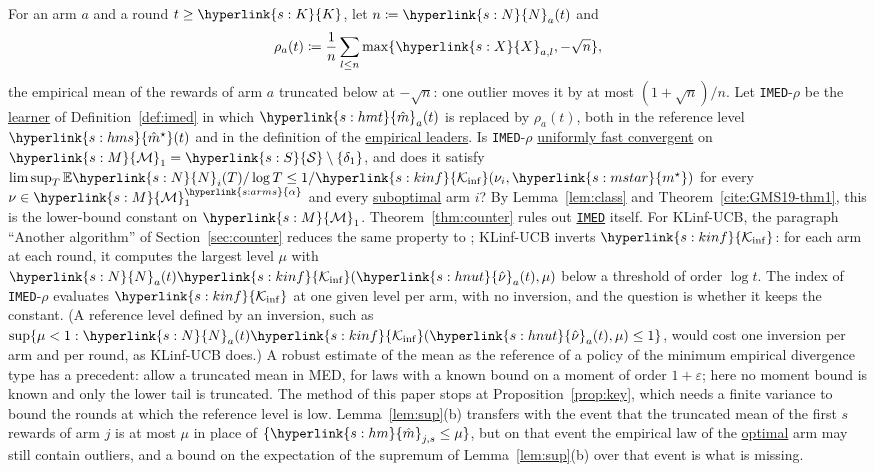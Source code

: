 \documentclass[11pt]{article}
\newcommand{\E}{\mathbb{E}}
\newcommand{\sy}[2]{{\hyperlink{#1}{#2}}}
\newcommand{\term}[2]{\hyperlink{#1}{#2}}
\newcommand{\imed}{\hyperref[alg:imed]{\texttt{IMED}}}
\newcommand{\Sm}{\sy{s:S}{\mathcal{S}}}
\newcommand{\Mm}{\sy{s:M}{\mathcal{M}}}
\newcommand{\arms}{\sy{s:arms}{\alpha}}
\newcommand{\Karms}{\sy{s:K}{K}}
\newcommand{\ms}{\sy{s:mstar}{m^{\star}}}
\newcommand{\Kinf}{\sy{s:kinf}{\mathcal{K}_{\inf}}}
\newcommand{\Xs}{\sy{s:X}{X}}
\newcommand{\Np}{\sy{s:N}{N}}
\newcommand{\hm}{\sy{s:hm}{\hat{m}}}
\newcommand{\hnut}{\sy{s:hnut}{\hat{\nu}}}
\newcommand{\hmt}{\sy{s:hmt}{\hat{m}}}
\newcommand{\hms}{\sy{s:hms}{\hat{m}^{\star}}}
\begin{document}
\begin{openquestion}\label{oq:finite-mean}
For an arm $a$ and a round $t\ge\Karms$, let $n\coloneqq\Np_a(t)$ and
\begin{equation*}
  \rho_a(t)\coloneqq\frac1n\sum_{l\le n}\max\{\Xs_{a,l},-\sqrt n\},
\end{equation*}
the empirical mean of the rewards of arm $a$ truncated below at $-\sqrt n$: one outlier moves it by at
most $(1+\sqrt n)/n$. Let \texttt{IMED}-$\rho$ be the \term{w:learner}{learner} of
Definition~\ref{def:imed} in which $\hmt_a(t)$ is replaced by $\rho_a(t)$, both in the reference level
$\hms(t)$ and in the definition of the \term{w:leader}{empirical leaders}. Is \texttt{IMED}-$\rho$
\term{w:ufc}{uniformly fast convergent} on $\Mm_1=\Sm\setminus\{\delta_1\}$, and does it satisfy
$\limsup_T\E \Np_i(T)/\log T\le1/\Kinf(\nu_i,\ms)$ for every $\nu\in\Mm_1^\arms$ and every
\term{w:subopt}{suboptimal} arm $i$? By Lemma~\ref{lem:class} and Theorem~\ref{cite:GMS19-thm1}, this is the
lower-bound constant on $\Mm_1$. Theorem~\ref{thm:counter} rules out \imed{} itself. For KLinf-UCB,
the paragraph ``Another algorithm'' of Section~\ref{sec:counter} reduces the same property to
\citet[Theorem~3.1]{PA26}; KLinf-UCB inverts $\Kinf$: for each arm at each round, it computes
the largest level $\mu$ with $\Np_a(t)\Kinf(\hnut_a(t),\mu)$ below a threshold of order $\log t$. The index of \texttt{IMED}-$\rho$
evaluates $\Kinf$ at one given level per arm, with no inversion, and the question is whether it keeps
the constant. (A reference level defined by an inversion, such as
$\sup\{\mu<1:\Np_a(t)\Kinf(\hnut_a(t),\mu)\le1\}$, would cost one inversion per arm and per round, as
KLinf-UCB does.) A robust estimate of the mean as the reference of a policy of the minimum empirical
divergence type has a precedent: \citet[Remark~1 and Appendix~B.4]{BSH23} allow a truncated mean in
MED, for laws with a known bound on a moment of order $1+\varepsilon$; here no moment bound is known
and only the lower tail is truncated. The method of this paper stops at
Proposition~\ref{prop:key}, which needs a finite variance to bound the rounds at which the reference
level is low. Lemma~\ref{lem:sup}(b) transfers with the event that the truncated mean of the first
$s$ rewards of arm $j$ is at most $\mu$ in place of $\{\hm_{j,s}\le\mu\}$, but on that event the empirical law of the \term{w:optimal}{optimal} arm may still
contain outliers, and a bound on the expectation of the supremum of Lemma~\ref{lem:sup}(b) over that
event is what is missing.
\end{openquestion}
\end{document}
